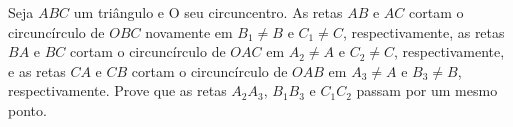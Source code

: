 Seja $ABC$ um triângulo e O seu circuncentro.
As retas $AB$ e $AC$ cortam o circuncírculo de $OBC$ novamente em $B_1 \neq B$ e $C_1 \neq C$, respectivamente, as retas $BA$ e $BC$ cortam o circuncírculo de $OAC$ em $A_2 \neq A$ e $C_2 \neq C$, respectivamente, e as retas $CA$ e $CB$ cortam o circuncírculo de $OAB$ em $A_3 \neq A$ e $B_3 \neq B$, respectivamente.
Prove que as retas $A_2A_3$, $B_1B_3$ e $C_1C_2$ passam por um mesmo ponto.